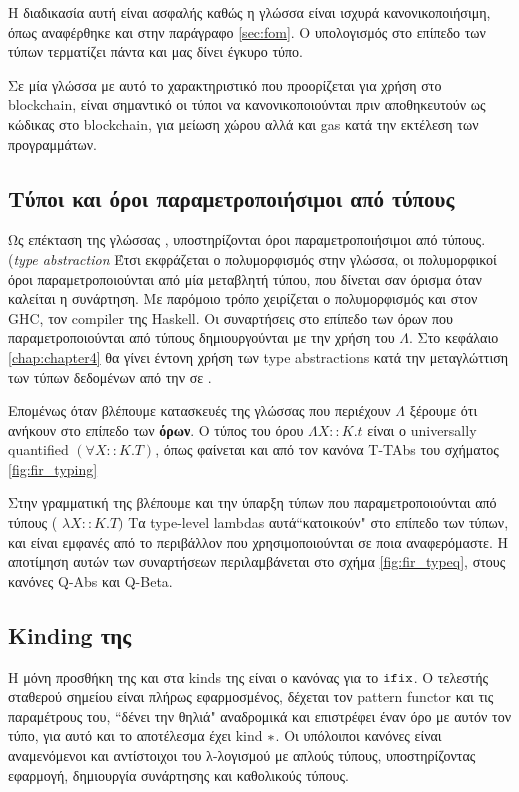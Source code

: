 Η διαδικασία αυτή είναι ασφαλής καθώς η γλώσσα \FOMF{} είναι ισχυρά κανονικοποιήσιμη, όπως αναφέρθηκε
και στην παράγραφο \ref{sec:fom}. Ο υπολογισμός στο επίπεδο των τύπων τερματίζει πάντα και μας δίνει
έγκυρο τύπο.

Σε μία γλώσσα με αυτό το χαρακτηριστικό που προορίζεται για χρήση στο blockchain, είναι σημαντικό
οι τύποι να κανονικοποιούνται πριν αποθηκευτούν ως κώδικας στο blockchain, για μείωση χώρου αλλά
και gas κατά την εκτέλεση των προγραμμάτων.



\subsection{Τύποι και όροι παραμετροποιήσιμοι από τύπους}

Ως επέκταση της γλώσσας \FOM, υποστηρίζονται όροι παραμετροποιήσιμοι από τύπους. 
(\emph{type abstraction}
Έτσι εκφράζεται ο πολυμορφισμός στην γλώσσα, οι πολυμορφικοί όροι παραμετροποιούνται
από μία μεταβλητή τύπου, που δίνεται σαν όρισμα όταν καλείται η συνάρτηση. Με παρόμοιο
τρόπο χειρίζεται ο πολυμορφισμός και στον GHC, τον compiler της Haskell. Οι συναρτήσεις
στο επίπεδο των όρων που παραμετροποιούνται από τύπους δημιουργούνται με την χρήση
του $\Lambda$. Στο κεφάλαιο \ref{chap:chapter4} θα γίνει έντονη χρήση των type abstractions
κατά την μεταγλώττιση των τύπων δεδομένων από την \FIR{} σε \FOMF{}. 


Επομένως όταν 
βλέπουμε κατασκευές της γλώσσας που περιέχουν $\Lambda$ ξέρουμε ότι ανήκουν
στο επίπεδο των \textbf{όρων}. Ο τύπος του όρου $ \Lambda X :: K . t $ είναι ο universally
quantified $(\forall X::K.T)$, όπως φαίνεται και από τον κανόνα T-TAbs του σχήματος \ref{fig:fir_typing}

Στην γραμματική της \FOMF{} βλέπουμε και την ύπαρξη τύπων που παραμετροποιούνται από
τύπους ( $\lambda X :: K. T)$ Τα type-level lambdas αυτά``κατοικούν" στο επίπεδο των τύπων,
και είναι εμφανές από το περιβάλλον που χρησιμοποιούνται σε ποια αναφερόμαστε. Η αποτίμηση
αυτών των συναρτήσεων περιλαμβάνεται στο σχήμα \ref{fig:fir_typeq}, στους κανόνες Q-Abs και
Q-Beta.









\subsection{Kinding της \FOMF{}}
Η μόνη προσθήκη της \FOMF{} και \FIR{} στα kinds της \FOM{} είναι ο κανόνας
για το $\operatorname{\texttt{ifix}}$. Ο τελεστής σταθερού σημείου είναι πλήρως εφαρμοσμένος, δέχεται
τον pattern functor και τις παραμέτρους  του, ``δένει την θηλιά" αναδρομικά και επιστρέφει
έναν όρο με αυτόν τον τύπο, για αυτό και το αποτέλεσμα έχει kind $\operatorname{\ast}$. Οι υπόλοιποι 
κανόνες είναι αναμενόμενοι και αντίστοιχοι του λ-λογισμού με απλούς τύπους, υποστηρίζοντας
εφαρμογή, δημιουργία συνάρτησης και καθολικούς τύπους.

\vspace{1cm}
